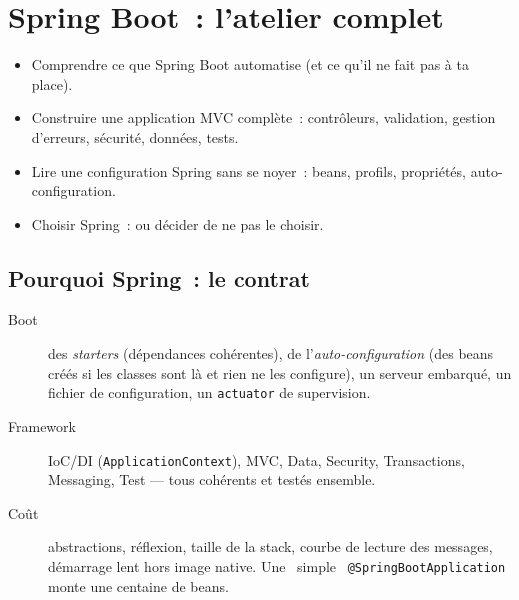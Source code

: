 \documentclass[12pt,a4paper,twoside,openright]{book}
\begin{document}
\chapter{Spring Boot~: l'atelier complet}
\label{ch-java-spring}

\begin{objectif}
\begin{itemize}
  \item Comprendre ce que Spring Boot automatise (et ce qu'il ne fait pas \`a ta place).
  \item Construire une application MVC compl\`ete~: contr\^oleurs, validation, gestion d'erreurs,
        s\'ecurit\'e, donn\'ees, tests.
  \item Lire une configuration Spring sans se noyer~: beans, profils, propri\'et\'es, auto-configuration.
  \item Choisir Spring~: ou d\'ecider de ne pas le choisir.
\end{itemize}
\end{objectif}

\section{Pourquoi Spring~: le contrat}

\begin{description}
  \item[Boot] des \emph{starters} (d\'ependances coh\'erentes), de l'\emph{auto-configuration} (des beans
        cr\'e\'es si les classes sont l\`a et rien ne les configure), un serveur embarqu\'e, un fichier
        de configuration, un \verb|actuator| de supervision.
  \item[Framework] IoC/DI (\verb|ApplicationContext|), MVC, Data, Security, Transactions, Messaging,
        Test --- tous coh\'erents et test\'es ensemble.
  \item[Co\^ut] abstractions, r\'eflexion, taille de la stack, courbe de lecture des messages,
        d\'emarrage lent hors image native. Une \og ~simple~ \fg{} \verb|@SpringBootApplication| monte
        une centaine de beans.
\end{description}
\end{document}
